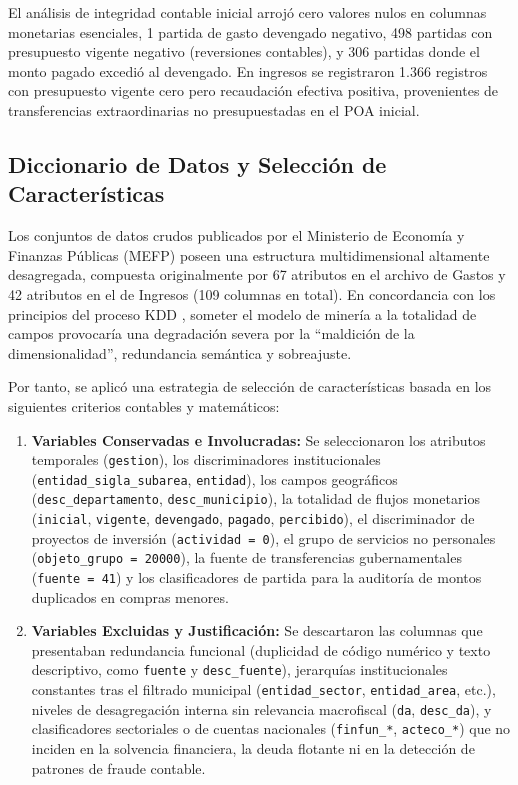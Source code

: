 \documentclass[11pt,a4paper]{article}
\begin{document}


El análisis de integridad contable inicial arrojó cero valores nulos en columnas monetarias esenciales, 1 partida de gasto devengado negativo, 498 partidas con presupuesto vigente negativo (reversiones contables), y 306 partidas donde el monto pagado excedió al devengado. En ingresos se registraron 1.366 registros con presupuesto vigente cero pero recaudación efectiva positiva, provenientes de transferencias extraordinarias no presupuestadas en el POA inicial.

\subsection{Diccionario de Datos y Selección de Características}
Los conjuntos de datos crudos publicados por el Ministerio de Economía y Finanzas Públicas (MEFP) poseen una estructura multidimensional altamente desagregada, compuesta originalmente por 67 atributos en el archivo de Gastos y 42 atributos en el de Ingresos (109 columnas en total). En concordancia con los principios del proceso KDD \citep{fayyad1996kdd}, someter el modelo de minería a la totalidad de campos provocaría una degradación severa por la ``maldición de la dimensionalidad'', redundancia semántica y sobreajuste.

Por tanto, se aplicó una estrategia de selección de características basada en los siguientes criterios contables y matemáticos:
\begin{enumerate}[label=\textbf{\alph*)}]
    \item \textbf{Variables Conservadas e Involucradas:} Se seleccionaron los atributos temporales (\texttt{gestion}), los discriminadores institucionales (\texttt{entidad\_sigla\_subarea}, \texttt{entidad}), los campos geográficos (\texttt{desc\_departamento}, \texttt{desc\_municipio}), la totalidad de flujos monetarios (\texttt{inicial}, \texttt{vigente}, \texttt{devengado}, \texttt{pagado}, \texttt{percibido}), el discriminador de proyectos de inversión (\texttt{actividad = 0}), el grupo de servicios no personales (\texttt{objeto\_grupo = 20000}), la fuente de transferencias gubernamentales (\texttt{fuente = 41}) y los clasificadores de partida para la auditoría de montos duplicados en compras menores.
    \item \textbf{Variables Excluidas y Justificación:} Se descartaron las columnas que presentaban redundancia funcional (duplicidad de código numérico y texto descriptivo, como \texttt{fuente} y \texttt{desc\_fuente}), jerarquías institucionales constantes tras el filtrado municipal (\texttt{entidad\_sector}, \texttt{entidad\_area}, etc.), niveles de desagregación interna sin relevancia macrofiscal (\texttt{da}, \texttt{desc\_da}), y clasificadores sectoriales o de cuentas nacionales (\texttt{finfun\_*}, \texttt{acteco\_*}) que no inciden en la solvencia financiera, la deuda flotante ni en la detección de patrones de fraude contable.
\end{enumerate}
\end{document}
